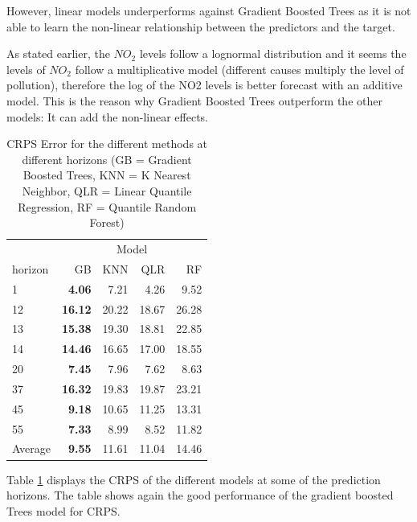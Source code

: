 \documentclass[a4paper,twocolumn,5p]{elsarticle}
\begin{document}
However, linear models 
underperforms against Gradient Boosted Trees 
as it is not able 
to learn the non-linear relationship between the 
predictors and the target. 

As stated earlier, the $NO_2$ levels 
follow a lognormal distribution and 
it seems the levels of $NO_2$ follow a multiplicative 
model (different causes multiply the level of pollution), 
therefore the log 
of the NO2 levels is better forecast with an additive model.
This is the reason 
why Gradient Boosted Trees outperform the other models:
It can add the non-linear effects.

\begin{table}[tbp]
  \centering
  \label{tab:determ}
  \caption{CRPS Error for the different methods at different
    horizons (GB = Gradient Boosted Trees,
    KNN = K Nearest Neighbor,
    QLR = Linear Quantile Regression,
    RF = Quantile Random Forest)
    }
    \begin{tabular}{lrrrr}
        \toprule
        \multicolumn{1}{|c|}{} & \multicolumn{4}{c|}{Model} \\  
        horizon &    GB &   KNN &   QLR &    RF \\
        \midrule
        1     &  \textbf{4.06} &  7.21 &  4.26 &  9.52 \\
        12    & \textbf{16.12} & 20.22 & 18.67 & 26.28 \\
        13    & \textbf{15.38} & 19.30 & 18.81 & 22.85 \\
        14    & \textbf{14.46} & 16.65 & 17.00 & 18.55 \\
        20    &  \textbf{7.45} &  7.96 &  7.62 &  8.63 \\
        37    & \textbf{16.32} & 19.83 & 19.87 & 23.21 \\
        45    &  \textbf{9.18} & 10.65 & 11.25 & 13.31 \\
        55    &  \textbf{7.33} &  8.99 &  8.52 & 11.82 \\
        Average & \textbf{9.55} & 11.61 & 11.04 & 14.46 \\
        \bottomrule
        \end{tabular}
\end{table}

Table \ref{tab:determ} displays the CRPS of the different models at some 
of the prediction horizons. The table shows again the good performance of the 
gradient boosted Trees model for CRPS. 
\end{document}
